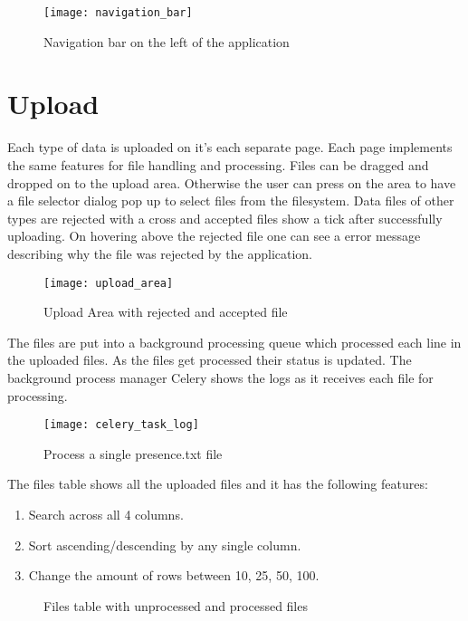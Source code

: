 \begin{figure}[H]
	\centering
	\texttt{[image: navigation\_bar]}
	\caption{Navigation bar on the left of the application}
	\label{fig:navigation}
\end{figure}

\section{Upload}

Each type of data is uploaded on it's each separate page. Each page implements
the same features for file handling and processing. Files can be dragged and dropped on
to the upload area. Otherwise the user can press on the area to have a file selector dialog pop up
to select files from the filesystem. Data files of other types
are rejected with a cross and accepted files show a tick after successfully uploading.
On hovering above the rejected file one can see a error message describing why the file
was rejected by the application.

\begin{figure}[H]
	\centering
	\texttt{[image: upload\_area]}
	\caption{Upload Area with rejected and accepted file}
	\label{fig:upload-area}
\end{figure}

The files are put into a background processing queue which processed each line in the uploaded
files. As the files get processed their status is updated. The background
process manager Celery shows the logs as it receives each file for processing.
\begin{figure}[H]
	\centering
	\texttt{[image: celery\_task\_log]}
	\caption{Process a single presence.txt file}
	\label{fig:celery-task-log}
\end{figure}

The files table shows all the uploaded files and it has
the following features:
\begin{enumerate}
	\item Search across all 4 columns.
	\item Sort ascending/descending by any single column.
	\item Change the amount of rows between 10, 25, 50, 100.
\end{enumerate}

\begin{figure}[H]
	\centering

	\caption{Files table with unprocessed and processed files}
	\label{fig:upload-table}
\end{figure}

